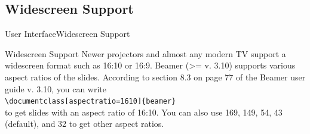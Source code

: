 \documentclass[10pt,aspectratio=169
	]{beamer}
\begin{document}
\begin{frame}
\end{frame}

\begin{frame}
\end{frame}

\subsection{Widescreen Support}
\begin{frame}{User Interface}{Widescreen Support}
\begin{block}{Widescreen Support}
	Newer projectors and almost any modern TV support a widescreen format such as 16:10 or 16:9. Beamer (>= v. 3.10) supports various aspect ratios of the slides. According to section 8.3 on page 77 of the Beamer user guide v. 3.10, you can write\\
{\tt\textbackslash documentclass[aspectratio=1610]\{beamer\}}\\
to get slides with an aspect ratio of 16:10. You can also use 169, 149, 54, 43 (default), and 32 to get other aspect ratios.
\end{block}
\end{frame}

\begin{frame}
\end{frame}
\end{document}
